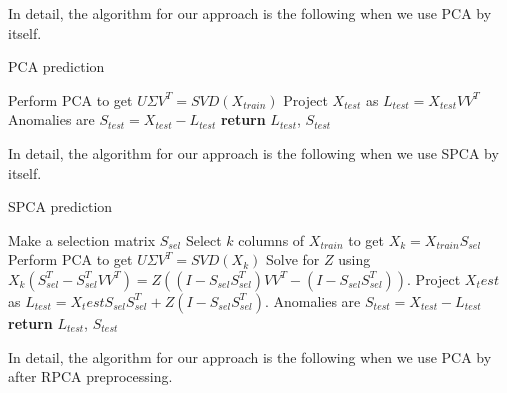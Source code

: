 \documentclass[conference]{IEEEtran}
\begin{document}
In detail, the algorithm for our approach is the following when we use PCA by itself.  

\begin{algorithm}
\caption{PCA prediction}\label{alg:pca prediction}
\begin{algorithmic}[1]
\State Perform PCA to get $U \Sigma V^T = SVD(X_{train})$
\State Project $X_{test}$ as $L_{test} = X_{test} V V^T$
\State Anomalies are $S_{test} = X_{test} - L_{test}$
\State \textbf{return} $L_{test}$, $S_{test}$
\EndProcedure
\end{algorithmic}
\end{algorithm}

In detail, the algorithm for our approach is the following when we use SPCA by itself.

\begin{algorithm}
\caption{SPCA prediction}\label{alg:spca prediction}
\begin{algorithmic}[1]
\State Make a selection matrix $S_{sel}$
\State Select $k$ columns of $X_{train}$ to get $X_k = X_{train} S_{sel}$
\State Perform PCA to get $U \Sigma V^T = SVD(X_k)$
\State Solve for $Z$ using $X_k (S_{sel}^T - S_{sel}^T V V^T) = Z ((I-S_{sel} S_{sel}^T)V V^T - (I-S_{sel} S_{sel}^T))$.
\State Project $X_test$ as $L_{test} = X_test S_{sel} S_{sel}^T + Z (I-S_{sel} S_{sel}^T)$.
\State Anomalies are $S_{test} = X_{test} - L_{test}$
\State \textbf{return} $L_{test}$, $S_{test}$
\EndProcedure
\end{algorithmic}
\end{algorithm}

In detail, the algorithm for our approach is the following when we use PCA by after RPCA preprocessing. 
\end{document}
